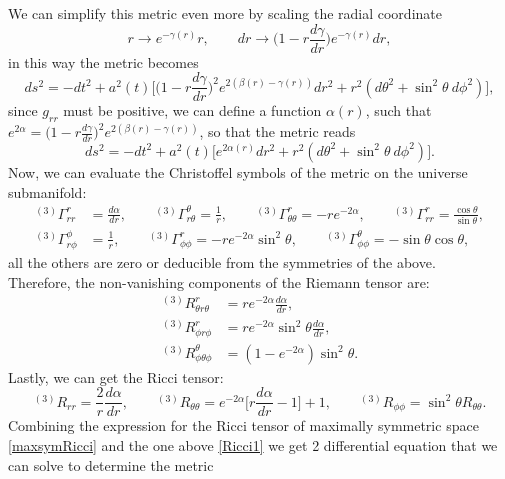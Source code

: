 We can simplify this metric even more by scaling the radial coordinate
\begin{equation}
    r\rightarrow e^{-\gamma(r)}r,\qquad dr\rightarrow \bigg(1-r\frac{d\gamma}{dr}\bigg)e^{-\gamma(r)}dr,
\end{equation}
in this way the metric becomes
\begin{equation}
    ds^2=-dt^2+a^2(t)\bigg[\bigg(1-r\frac{d\gamma}{dr}\bigg)^{2}e^{2(\beta(r)-\gamma(r))}dr^2+r^2(d\theta^2+\sin^2\theta\ d\phi^2)\bigg],
\end{equation}
since $g_{rr}$ must be positive, we can define a function $\alpha(r)$, such that $e^{2\alpha}=\big(1-r\frac{d\gamma}{dr}\big)^{2}e^{2(\beta(r)-\gamma(r))}$, so that the metric reads
\begin{equation}
    ds^2=-dt^2+a^2(t)\big[e^{2\alpha(r)}dr^2+r^2(d\theta^2+\sin^2\theta\ d\phi^2)\big].
\end{equation}
Now, we can evaluate the Christoffel symbols of the metric on the universe submanifold:
\begin{align}
    ^{(3)}\Gamma_{rr}^r&=\frac{d\alpha}{dr},\qquad^{(3)}\Gamma_{r\theta}^\theta=\frac{1}{r},\qquad^{(3)}\Gamma_{\theta\theta}^r=-re^{-2\alpha},\qquad^{(3)}\Gamma_{rr}^r=\frac{\cos\theta}{\sin\theta},\nonumber\\
    ^{(3)}\Gamma_{r\phi}^\phi&=\frac{1}{r},\qquad^{(3)}\Gamma_{\phi\phi}^r=-re^{-2\alpha}\sin^2\theta,\qquad^{(3)}\Gamma_{\phi\phi}^\theta=-\sin\theta\cos\theta,
\end{align}
all the others are zero or deducible from the symmetries of the above.\\ Therefore, the non-vanishing components of the Riemann tensor are:
\begin{align}
    ^{(3)}R^r_{\theta r\theta}&=re^{-2\alpha}\frac{d\alpha}{dr},\nonumber\\
    ^{(3)}R^r_{\phi r\phi}&=re^{-2\alpha}\sin^2\theta\frac{d\alpha}{dr},\nonumber\\
    ^{(3)}R^\theta_{\phi \theta\phi}&=(1-e^{-2\alpha})\sin^2\theta.
\end{align}
Lastly, we can get the Ricci tensor:
\begin{equation}
    ^{(3)}R_{rr}=\frac{2}{r}\frac{d\alpha}{dr},\qquad ^{(3)}R_{\theta\theta}=e^{-2\alpha}\bigg[r\frac{d\alpha}{dr}-1\bigg]+1,\qquad ^{(3)}R_{\phi\phi}=\sin^2\theta R_{\theta\theta}.\label{Ricci1}
\end{equation}
Combining the expression for the Ricci tensor of maximally symmetric space \eqref{maxsymRicci} and the one above \eqref{Ricci1} we get 2 differential equation that we can solve to determine the metric
